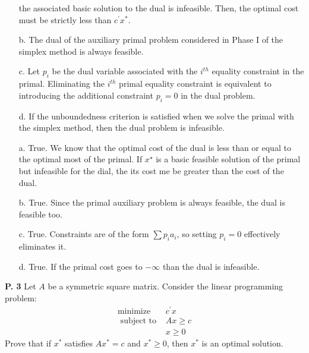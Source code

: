 \documentclass{article}
\begin{document}
\begin{jacklist}
\begin{framed}
\begin{itemize}
                the associated basic solution to the dual is infeasible. Then, the optimal cost must be 
                strictly less than $c^{\prime} x^{*}$.
            \item [b.] The dual of the auxiliary primal problem considered in Phase I of the simplex method is always feasible.
            \item [c.] Let $p_{i}$ be the dual variable associated with the $i^{th}$ equality constraint in the primal. 
                Eliminating the $i^{th}$ primal equality constraint is equivalent to introducing the additional constraint 
                $p_{i}=0$ in the dual problem.
            \item [d.]  If the unboundedness criterion is satisfied when we solve the primal with the simplex method, 
                then the dual problem is infeasible. 
        \end{itemize}
    \end{framed}
    \begin{itemize}
        \item [a.] True. We know that the optimal cost of the dual is less than or equal to the optimal most of the primal. If 
            $x^\star$ is a basic feasible solution of the primal but infeasible for the dial, the its cost me be greater than the cost
            of the dual. 
        \item [b.] True. Since the primal auxiliary problem is always feasible, the dual is feasible too.
        \item [c.] True. Constraints are of the form $\sum p_ia_i$, so setting $p_i = 0$ effectively eliminates it. 
        \item [d.] True. If the primal cost goes to $- \infty$ than the dual is infeasible. 
    \end{itemize}
\newpage
    \begin{framed} 
    \item [\textbf{P. 3}] Let $A$ be a symmetric square matrix. Consider the linear programming problem: 
        \begin{align*}
            \text{minimize } & c^\prime x \\
            \text { subject to } & A x \geq c \\
            & x \geq 0
        \end{align*}
        Prove that if $x^{*}$ satisfies $A x^{*}=c$ and $x^{*} \geq 0$, then $x^{*}$ is an optimal solution.
    \end{framed}
\newpage
    \begin{framed} 

\end{framed}
\end{jacklist}
\end{document}
